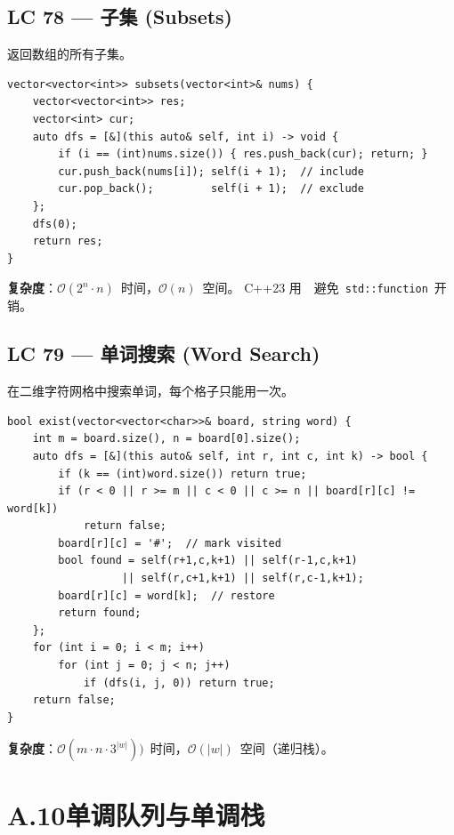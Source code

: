 \documentclass[12pt,a4paper,fontset=fandol]{ctexbook}
\newcommand{\bigO}[1]{\mathcal{O}(#1)}
\newcommand{\Tp}[1]{\texttt{#1}}
\begin{document}
\subsection*{LC 78 — 子集 (Subsets)}

返回数组的所有子集。

\begin{lstlisting}[style=cppstyle]
vector<vector<int>> subsets(vector<int>& nums) {
    vector<vector<int>> res;
    vector<int> cur;
    auto dfs = [&](this auto& self, int i) -> void {
        if (i == (int)nums.size()) { res.push_back(cur); return; }
        cur.push_back(nums[i]); self(i + 1);  // include
        cur.pop_back();         self(i + 1);  // exclude
    };
    dfs(0);
    return res;
}
\end{lstlisting}
\textbf{复杂度}：$\bigO{2^n \cdot n}$~时间，$\bigO{n}$~空间。
C++23 用~\texttt{}~避免~\Tp{std::function}~开销。

\subsection*{LC 79 — 单词搜索 (Word Search)}

在二维字符网格中搜索单词，每个格子只能用一次。

\begin{lstlisting}[style=cppstyle]
bool exist(vector<vector<char>>& board, string word) {
    int m = board.size(), n = board[0].size();
    auto dfs = [&](this auto& self, int r, int c, int k) -> bool {
        if (k == (int)word.size()) return true;
        if (r < 0 || r >= m || c < 0 || c >= n || board[r][c] != word[k])
            return false;
        board[r][c] = '#';  // mark visited
        bool found = self(r+1,c,k+1) || self(r-1,c,k+1)
                  || self(r,c+1,k+1) || self(r,c-1,k+1);
        board[r][c] = word[k];  // restore
        return found;
    };
    for (int i = 0; i < m; i++)
        for (int j = 0; j < n; j++)
            if (dfs(i, j, 0)) return true;
    return false;
}
\end{lstlisting}
\textbf{复杂度}：$\bigO{m \cdot n \cdot 3^{|w|})}$~时间，$\bigO{|w|}$~空间（递归栈）。

\section*{A.10\quad 单调队列与单调栈}
\end{document}
